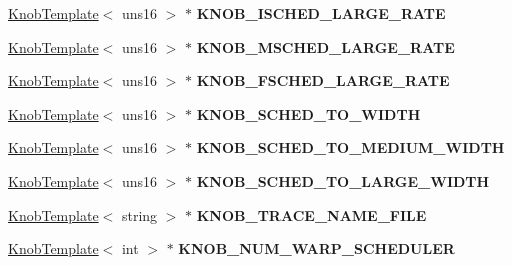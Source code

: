\begin{DoxyCompactItemize}
\item 
\hypertarget{classall__knobs__c_a81b179b762b69ddacf0951b93244c50a}{
\hyperlink{classKnobTemplate}{KnobTemplate}$<$ uns16 $>$ $\ast$ {\bfseries KNOB\_\-ISCHED\_\-LARGE\_\-RATE}}
\label{classall__knobs__c_a81b179b762b69ddacf0951b93244c50a}

\item 
\hypertarget{classall__knobs__c_a8b475f4f0f73e83436db4d003e3380b3}{
\hyperlink{classKnobTemplate}{KnobTemplate}$<$ uns16 $>$ $\ast$ {\bfseries KNOB\_\-MSCHED\_\-LARGE\_\-RATE}}
\label{classall__knobs__c_a8b475f4f0f73e83436db4d003e3380b3}

\item 
\hypertarget{classall__knobs__c_a5925a54b4a2acfeb9796852304bff300}{
\hyperlink{classKnobTemplate}{KnobTemplate}$<$ uns16 $>$ $\ast$ {\bfseries KNOB\_\-FSCHED\_\-LARGE\_\-RATE}}
\label{classall__knobs__c_a5925a54b4a2acfeb9796852304bff300}

\item 
\hypertarget{classall__knobs__c_afa53045bd21be8cd890e35cbcb348f7f}{
\hyperlink{classKnobTemplate}{KnobTemplate}$<$ uns16 $>$ $\ast$ {\bfseries KNOB\_\-SCHED\_\-TO\_\-WIDTH}}
\label{classall__knobs__c_afa53045bd21be8cd890e35cbcb348f7f}

\item 
\hypertarget{classall__knobs__c_a32a73afdf9bda47ebc2144102fc20544}{
\hyperlink{classKnobTemplate}{KnobTemplate}$<$ uns16 $>$ $\ast$ {\bfseries KNOB\_\-SCHED\_\-TO\_\-MEDIUM\_\-WIDTH}}
\label{classall__knobs__c_a32a73afdf9bda47ebc2144102fc20544}

\item 
\hypertarget{classall__knobs__c_ad40adfc004f1b54ec76ee65fb25d4c75}{
\hyperlink{classKnobTemplate}{KnobTemplate}$<$ uns16 $>$ $\ast$ {\bfseries KNOB\_\-SCHED\_\-TO\_\-LARGE\_\-WIDTH}}
\label{classall__knobs__c_ad40adfc004f1b54ec76ee65fb25d4c75}

\item 
\hypertarget{classall__knobs__c_a118a6d1c593f0329ea3b6cffa47957bc}{
\hyperlink{classKnobTemplate}{KnobTemplate}$<$ string $>$ $\ast$ {\bfseries KNOB\_\-TRACE\_\-NAME\_\-FILE}}
\label{classall__knobs__c_a118a6d1c593f0329ea3b6cffa47957bc}

\item 
\hypertarget{classall__knobs__c_af5d1b87126499ad6b6015a6f84fccfb0}{
\hyperlink{classKnobTemplate}{KnobTemplate}$<$ int $>$ $\ast$ {\bfseries KNOB\_\-NUM\_\-WARP\_\-SCHEDULER}}
\label{classall__knobs__c_af5d1b87126499ad6b6015a6f84fccfb0}


\end{DoxyCompactItemize}
